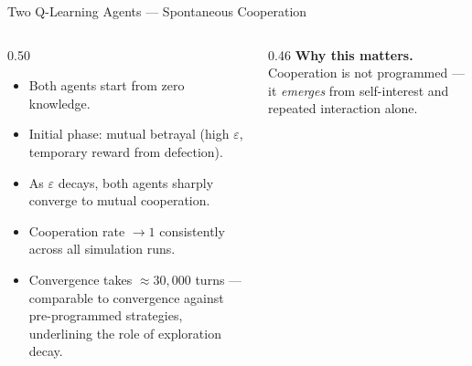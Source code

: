 \documentclass[10pt, aspectratio=169]{beamer}
\begin{document}
\begin{frame}{Two Q-Learning Agents — Spontaneous Cooperation}
  \begin{columns}[T]
    \begin{column}{0.50\textwidth}
      \begin{itemize}
        \item Both agents start from zero knowledge.
        \item Initial phase: mutual betrayal (high \(\varepsilon\), temporary reward from defection).
        \item As \(\varepsilon\) decays, both agents \alert{sharply converge to mutual cooperation}.
        \item Cooperation rate \(\to 1\) consistently across all simulation runs.
        \item Convergence takes \(\approx 30{,}000\) turns — comparable to convergence against pre-programmed strategies, underlining the role of exploration decay.
      \end{itemize}
    \end{column}
    \begin{column}{0.46\textwidth}
      \small
      \textbf{Why this matters.} Cooperation is not programmed — it \emph{emerges} from self-interest and repeated interaction alone.
    \end{column}
  \end{columns}
\end{frame}
\end{document}
